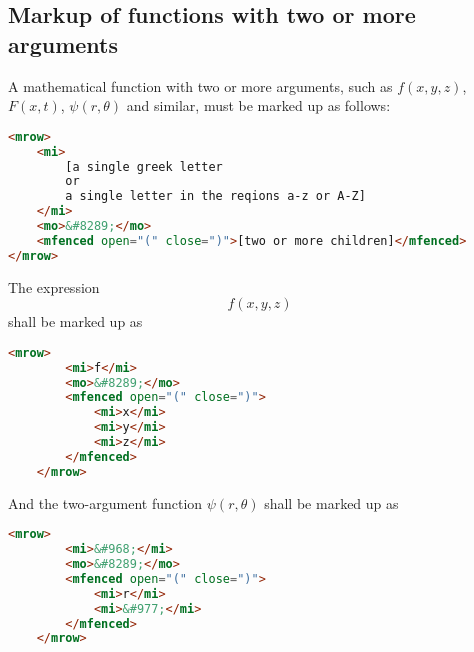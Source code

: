 \documentclass[english,a4paper,11pt]{article}
\begin{document}
\subsection{Markup of functions with two or more arguments}
A mathematical function with two or more arguments, such as $f(x,y,z)$, $F(x,t)$, $\psi (r, \theta )$ and similar, must be marked up as follows:
\begin{lstlisting}[language=HTML]
<mrow>
	<mi>
		[a single greek letter 
		or 
		a single letter in the reqions a-z or A-Z]
	</mi>
	<mo>&#8289;</mo>
	<mfenced open="(" close=")">[two or more children]</mfenced>
</mrow>
\end{lstlisting}


\begin{eksempler}
	The expression 
	\begin{equation}f(x,y,z)\end{equation}
	shall be marked up as
	\begin{lstlisting}[language=HTML]
	<mrow>
		<mi>f</mi>
		<mo>&#8289;</mo>
		<mfenced open="(" close=")">
			<mi>x</mi>
			<mi>y</mi>
			<mi>z</mi>
		</mfenced>
	</mrow>
	\end{lstlisting}
	
	And the two-argument function 
	$\psi (r, \theta )$
	shall be marked up as
	\begin{lstlisting}[language=HTML]
	<mrow>
		<mi>&#968;</mi>
		<mo>&#8289;</mo>
		<mfenced open="(" close=")">
			<mi>r</mi>
			<mi>&#977;</mi>
		</mfenced>
	</mrow>
	\end{lstlisting}
\end{eksempler}
\end{document}
